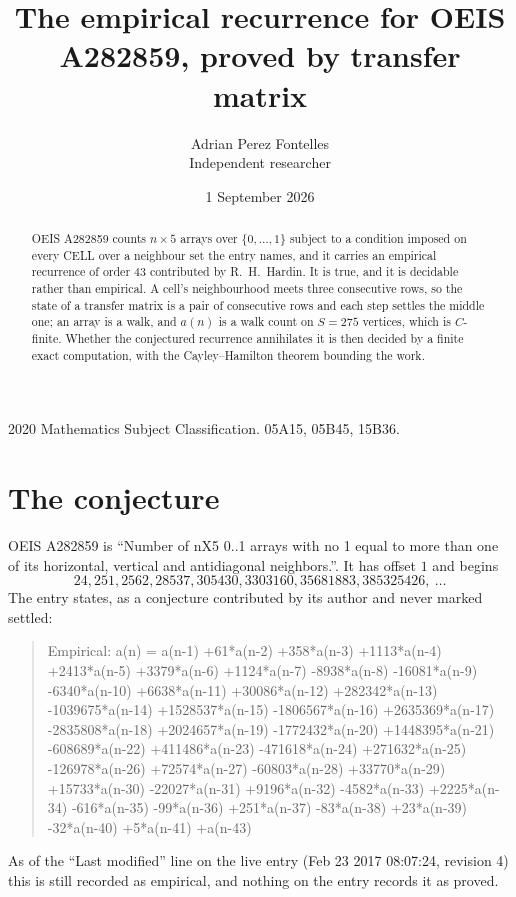 \documentclass[11pt,a4paper]{article}
\title{The empirical recurrence for OEIS A282859, proved by transfer matrix}
\author{Adrian Perez Fontelles\\ \small Independent researcher}
\date{1 September 2026}
\theoremstyle{plain}
\theoremstyle{definition}
\begin{document}
\maketitle

\begin{abstract}
OEIS A282859 counts $n\times5$ arrays over $\{0,\dots,1\}$ subject to a condition imposed on
every CELL over a neighbour set the entry names, and it carries an empirical recurrence of
order $43$ contributed by R.~H.~Hardin. It is true, and it is decidable rather than
empirical. A cell's neighbourhood meets three consecutive rows, so the state of a transfer
matrix is a pair of consecutive rows and each step settles the middle one; an array is a
walk, and $a(n)$ is a walk count on $S=275$ vertices, which is $C$-finite. Whether the
conjectured recurrence annihilates it is then decided by a finite exact computation, with the
Cayley--Hamilton theorem bounding the work.
\end{abstract}

\noindent\small 2020 Mathematics Subject Classification. 05A15, 05B45, 15B36.\normalsize

\section{The conjecture}

OEIS A282859 is ``Number of nX5 0..1 arrays with no 1 equal to more than one of its horizontal, vertical and antidiagonal neighbors.''. It has offset $1$ and begins
\[
24, 251, 2562, 28537, 305430, 3303160, 35681883, 385325426,\ \dots
\]
The entry states, as a conjecture contributed by its author and never marked settled:
\begin{quote}
Empirical: a(n) = a(n-1) +61*a(n-2) +358*a(n-3) +1113*a(n-4) +2413*a(n-5) +3379*a(n-6) +1124*a(n-7) -8938*a(n-8) -16081*a(n-9) -6340*a(n-10) +6638*a(n-11) +30086*a(n-12) +282342*a(n-13) -1039675*a(n-14) +1528537*a(n-15) -1806567*a(n-16) +2635369*a(n-17) -2835808*a(n-18) +2024657*a(n-19) -1772432*a(n-20) +1448395*a(n-21) -608689*a(n-22) +411486*a(n-23) -471618*a(n-24) +271632*a(n-25) -126978*a(n-26) +72574*a(n-27) -60803*a(n-28) +33770*a(n-29) +15733*a(n-30) -22027*a(n-31) +9196*a(n-32) -4582*a(n-33) +2225*a(n-34) -616*a(n-35) -99*a(n-36) +251*a(n-37) -83*a(n-38) +23*a(n-39) -32*a(n-40) +5*a(n-41) +a(n-43)
\end{quote}
As of the ``Last modified'' line on the live entry (Feb 23 2017 08:07:24, revision 4) this is still
recorded as empirical, and nothing on the entry records it as proved.
\end{document}
